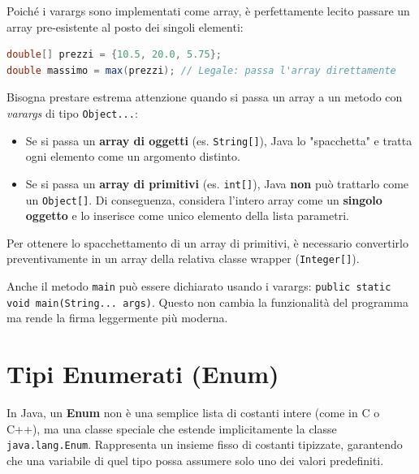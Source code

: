Poiché i varargs sono implementati come array, è perfettamente lecito passare un array pre-esistente al posto dei singoli elementi:

\begin{lstlisting}[language=Java]
double[] prezzi = {10.5, 20.0, 5.75};
double massimo = max(prezzi); // Legale: passa l'array direttamente
\end{lstlisting}

\begin{warningbox}
    Bisogna prestare estrema attenzione quando si passa un array a un metodo con \textit{varargs} di tipo \texttt{Object...}:
    \begin{itemize}
        \item Se si passa un \textbf{array di oggetti} (es. \texttt{String[]}), Java lo "spacchetta" e tratta ogni elemento come un argomento distinto.
        \item Se si passa un \textbf{array di primitivi} (es. \texttt{int[]}), Java \textbf{non} può trattarlo come un \texttt{Object[]}. Di conseguenza, considera l'intero array come un \textbf{singolo oggetto} e lo inserisce come unico elemento della lista parametri.
    \end{itemize}
    Per ottenere lo spacchettamento di un array di primitivi, è necessario convertirlo preventivamente in un array della relativa classe wrapper (\texttt{Integer[]}).
\end{warningbox}

\begin{tip}
    Anche il metodo \texttt{main} può essere dichiarato usando i varargs: 
    \texttt{public static void main(String... args)}. 
    Questo non cambia la funzionalità del programma ma rende la firma leggermente più moderna.
\end{tip}



\section{Tipi Enumerati (Enum)}

In Java, un \textbf{Enum} non è una semplice lista di costanti intere (come in C o C++), ma una classe speciale che estende implicitamente la classe \texttt{java.lang.Enum}. Rappresenta un insieme fisso di costanti tipizzate, garantendo che una variabile di quel tipo possa assumere solo uno dei valori predefiniti.


